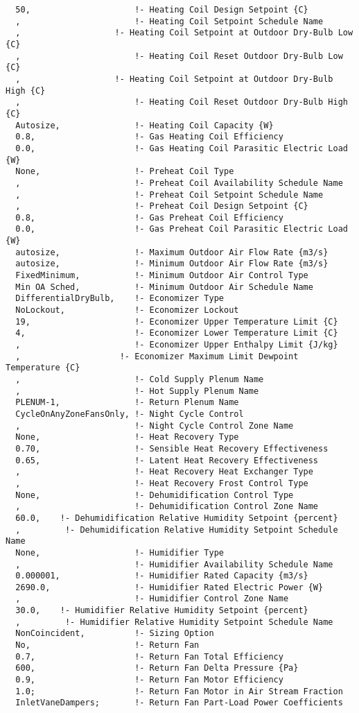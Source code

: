 \begin{lstlisting}
  50,                     !- Heating Coil Design Setpoint {C}
  ,                       !- Heating Coil Setpoint Schedule Name
  ,                   !- Heating Coil Setpoint at Outdoor Dry-Bulb Low {C}
  ,                       !- Heating Coil Reset Outdoor Dry-Bulb Low {C}
  ,                   !- Heating Coil Setpoint at Outdoor Dry-Bulb High {C}
  ,                       !- Heating Coil Reset Outdoor Dry-Bulb High {C}
  Autosize,               !- Heating Coil Capacity {W}
  0.8,                    !- Gas Heating Coil Efficiency
  0.0,                    !- Gas Heating Coil Parasitic Electric Load {W}
  None,                   !- Preheat Coil Type
  ,                       !- Preheat Coil Availability Schedule Name
  ,                       !- Preheat Coil Setpoint Schedule Name
  ,                       !- Preheat Coil Design Setpoint {C}
  0.8,                    !- Gas Preheat Coil Efficiency
  0.0,                    !- Gas Preheat Coil Parasitic Electric Load {W}
  autosize,               !- Maximum Outdoor Air Flow Rate {m3/s}
  autosize,               !- Minimum Outdoor Air Flow Rate {m3/s}
  FixedMinimum,           !- Minimum Outdoor Air Control Type
  Min OA Sched,           !- Minimum Outdoor Air Schedule Name
  DifferentialDryBulb,    !- Economizer Type
  NoLockout,              !- Economizer Lockout
  19,                     !- Economizer Upper Temperature Limit {C}
  4,                      !- Economizer Lower Temperature Limit {C}
  ,                       !- Economizer Upper Enthalpy Limit {J/kg}
  ,                    !- Economizer Maximum Limit Dewpoint Temperature {C}
  ,                       !- Cold Supply Plenum Name
  ,                       !- Hot Supply Plenum Name
  PLENUM-1,               !- Return Plenum Name
  CycleOnAnyZoneFansOnly, !- Night Cycle Control
  ,                       !- Night Cycle Control Zone Name
  None,                   !- Heat Recovery Type
  0.70,                   !- Sensible Heat Recovery Effectiveness
  0.65,                   !- Latent Heat Recovery Effectiveness
  ,                       !- Heat Recovery Heat Exchanger Type
  ,                       !- Heat Recovery Frost Control Type
  None,                   !- Dehumidification Control Type
  ,                       !- Dehumidification Control Zone Name
  60.0,    !- Dehumidification Relative Humidity Setpoint {percent}
  ,         !- Dehumidification Relative Humidity Setpoint Schedule Name
  None,                   !- Humidifier Type
  ,                       !- Humidifier Availability Schedule Name
  0.000001,               !- Humidifier Rated Capacity {m3/s}
  2690.0,                 !- Humidifier Rated Electric Power {W}
  ,                       !- Humidifier Control Zone Name
  30.0,    !- Humidifier Relative Humidity Setpoint {percent}
  ,         !- Humidifier Relative Humidity Setpoint Schedule Name
  NonCoincident,          !- Sizing Option
  No,                     !- Return Fan
  0.7,                    !- Return Fan Total Efficiency
  600,                    !- Return Fan Delta Pressure {Pa}
  0.9,                    !- Return Fan Motor Efficiency
  1.0;                    !- Return Fan Motor in Air Stream Fraction
  InletVaneDampers;       !- Return Fan Part-Load Power Coefficients
\end{lstlisting}

